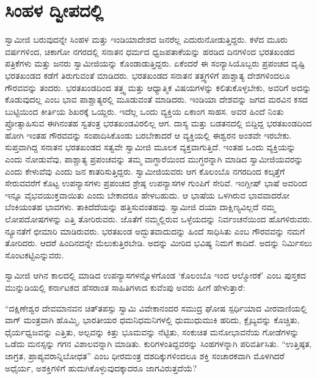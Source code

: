 
\chapter{ಸಿಂಹಳ ದ್ವೀಪದಲ್ಲಿ}

 ಸ್ವಾಮೀಜಿ ಬರುವುದನ್ನೇ ಸಿಂಹಳ ಮತ್ತು ಇಂಡಿಯಾದೇಶದ ಜನರೆಲ್ಲ ಎದುರು\break ನೋಡುತ್ತಿದ್ದರು. ಕಳೆದ ಮೂರು ವರ್ಷಗಳಿಂದ, ಚಿಕಾಗೋ ನಗರದಲ್ಲಿ ಸನಾತನ ಧರ್ಮದ ಧ್ವಜಪತಾಕೆಯನ್ನು ಹರಡಿದ ದಿನಗಳಿಂದ ಭರತಖಂಡದ ಪತ್ರಿಕೆಗಳು ಮತ್ತು ಜನರು ಸ್ವಾಮೀಜಿಯನ್ನು ಕೊಂಡಾಡುತ್ತಿದ್ದರು. ಏಕೆಂದರೆ ಈ ಸಂನ್ಯಾಸಿಯೊಬ್ಬರು ಪ್ರಪಂಚದ ದೃಷ್ಟಿ ಭರತಖಂಡದ ಕಡೆಗೆ ತಿರುಗುವಂತೆ ಮಾಡಿದರು. ಭರತಖಂಡದ ಸನಾತನ ತತ್ತ್ವಗಳಿಗೆ ಪಾಶ್ಚಾತ್ಯ ದೇಶಗಳಿಂದಲೂ ಗೌರವವನ್ನು ತಂದರು. ಭರತಖಂಡದಿಂದ ತತ್ತ್ವ ಮತ್ತು ಆಧ್ಯಾತ್ಮಿಕ ವಿಷಯಗಳನ್ನು ಕಲಿತುಕೊಳ್ಳಬೇಕು, ಅವರಿಗೆ ಅದನ್ನು ಕೊಡುವುದಲ್ಲ ಎಂಬ ಭಾವ ಪಾಶ್ಚಾತ್ಯರಲ್ಲಿ ಮೂಡುವಂತೆ ಮಾಡಿದರು. ಇಂಡಿಯಾ ದೇಶವನ್ನು ಜಗದ ಮರವಿನ ಕಸದ ಬುಟ್ಟಿಯಿಂದ ಕೀರ್ತಿಯ ಶಿಖರಕ್ಕೆ ಒಯ್ದರು. ಇದೆಲ್ಲ ಒಂದು ವ್ಯಕ್ತಿಯ ಏಕಾಂಗ ಸಾಹಸ. ಅವರ ಹಿಂದೆ ನಿಂತು ಪ್ರೋತ್ಸಾಹಿಸುವ ಈಗಿನಂತಹ ಸ್ವತಂತ್ರ ಭರತಖಂಡವಿರಲಿಲ್ಲ ಆಗ. ದಾಸ್ಯ ಮತ್ತು ಬಡತನದಲ್ಲಿ ಬಿದ್ದಿದ್ದ ಭರತಖಂಡದಿಂದ ಹೋಗಿ ಇಂತಹ ಗೌರವವನ್ನು ಸಂಪಾದಿಸಿಕೊಂಡು ಬರಬೇಕಾದರೆ ಆ ವ್ಯಕ್ತಿಯಲ್ಲಿ ಈಶ್ವರನ ಅಂಶವೇ ಇರಬೇಕು. ಸುಪ್ತವಾಗಿದ್ದ ಸನಾತನ ಭರತಖಂಡದ ಸತ್ವವೇ ಸ್ವಾಮೀಜಿ ಮೂಲಕ ವ್ಯಕ್ತವಾಗುತ್ತಿದೆ. ಇಂತಹ ಒಂದು ವ್ಯಕ್ತಿಯನ್ನು ಎಂದು ನೋಡುವೆವು, ಪಾಶ್ಚಾತ್ಯ ಪ್ರಪಂಚವನ್ನು ತಮ್ಮ ವಾಗ್ಧಾರೆಯಿಂದ ಮುಗ್ಧರನ್ನಾಗಿ ಮಾಡಿದ ಸ್ವಾಮೀಜಿಯವರನ್ನು ಎಂದು ಕೇಳುವೆವು ಎಂದು ಜನ ಕಾತರಿಸುತ್ತಿದ್ದರು. ಸ್ವಾಮೀಜಿಯವರು ಆಗ ಕೊಲಂಬೊ ನಗರದಿಂದ ಕಲ್ಕತ್ತೆಗೆ ಸೇರುವವರೆಗೆ ಕೊಟ್ಟ ಉಪನ್ಯಾಸಗಳು ಪ್ರಪಂಚದ ಶ್ರೇಷ್ಠ ಉಪನ್ಯಾಸಗಳ ಗುಂಪಿಗೆ ಸೇರಿವೆ. ಇಂಗ್ಲೀಷ್ ಭಾಷೆ ಅವರಿಂದ ಇನ್ನೂ ವೈಭವಯುಕ್ತವಾಯಿತು ಎಂದು ಬೇಕಾದರೂ ಹೇಳಬಹುದು. ಆ ಭಾಷೆಯ ಒಳಗಿರುವ ಭಾವವಾದರೋ‌ ಬೆಂಕಿಯಂತಹ ಭಾವಗಳು. ತಾಕಿದೆದೆಯನ್ನು ಹತ್ತಿಸುವಂತಹವು. ಸ್ವಾಮೀಜಿ ದಯಾ ದಾಕ್ಷಿಣ್ಯವಿಲ್ಲದೆ ನಮ್ಮ ಲೋಪದೋಷಗಳನ್ನು ಎತ್ತಿ ತೋರಿರುವರು. ಜೊತೆಗೆ ನಮ್ಮಲ್ಲಿರುವ ಒಳ್ಳೆಯದನ್ನು ನಿರ್ವಂಚನೆಯಿಂದ ಹೊಗಳಿರುವರು. ನ್ಯೂನತೆಗೆ ಛೀಮಾರಿ ಮಾಡಿರುವರು. ಭರತಖಂಡ ಅದ್ಭುತವಾದುದನ್ನು ಹಿಂದೆ ಸಾಧಿಸಿತು ಎಂಬ ಗೌರವವನ್ನು ನಮಗೆ ತೋರಿದರು. ಆದರೆ ಹಿಂದಿನದನ್ನೇ ಮೆಲುಕುತ್ತಿರಬೇಡಿ. ಅದನ್ನು ಮೀರಿದ ಭವಿಷ್ಯ ನಿಮಗೆ ಕಾದಿದೆ. ಅದನ್ನು ನಿರ್ಮಿಸಲು ಸೊಂಟಕಟ್ಟಿ\break ಎನ್ನುವರು. 

 ಸ್ವಾಮೀಜಿ ಆಗಿನ ಕಾಲದಲ್ಲಿ ಮಾಡಿದ ಉಪನ್ಯಾಸಗಳನ್ನೊಳಗೊಂಡ ‘ಕೊಲಂಬೊ ಇಂದ ಆಲ್ಮೋರಕೆ’ ಎಂಬ ಪುಸ್ತಕದ ಮುನ್ನುಡಿಯಲ್ಲಿ ಕರ್ನಾಟಕದ ಹೆಸರಾಂತ ಸಾಹಿತಿಗಳಾದ ಕುವೆಂಪು ಅವರು ಹೀಗೆ ಹೇಳುತ್ತಾರೆ: 

 “ದಕ್ಷಿಣೇಶ್ವರ ದೇವಮಾನವನ ಚಿತ್​ತಪಸ್ಸು ಸ್ವಾಮಿ ವಿವೇಕಾನಂದರ ಸಮುದ್ರ ಘೋಷ ಸ್ಪರ್ಧಿಯಾದ ವೀರವಾಣಿಯಲ್ಲಿ ವಾಗ್ ಮಂತ್ರವಾಗಿ ಹೊಮ್ಮಿ, ಭಾರತೀಯರ ಧಮನಿಧಮನಿಗಳಲ್ಲಿ ಧುಮುಧುಮುಕಿ ಹರಿದು, ಕ್ಲೈಬ್ಯವನ್ನು ಕೊಚ್ಚಿತು, ಧೈರ್ಯಧ್ವಜವನ್ನು ಎತ್ತಿತು, ಅಲ್ಪವನ್ನು ಕಿತ್ತು ಭೂಮವನ್ನು ನೆಟ್ಟಿತು, ಸಂಕುಚಿತ ಮನೋಭಾವನೆಯ ಗೋಡೆಗಳನ್ನು ಒಡೆದು ಮನಸ್ಸನ್ನು ಗಗನ ವಿಶಾಲವನ್ನಾಗಿ ಮಾಡಿತು. ಕುರಿಗಳಂತಿದ್ದವರನ್ನು ಸಿಂಹಗಳನ್ನಾಗಿ ಪರಿವರ್ತಿಸಿತು. “ಉತ್ತಿಷ್ಠತ, ಜಾಗ್ರತ, ಪ್ರಾಪ್ಯವರಾನ್ನಿಬೋಧತ” ಎಂಬ ಧೀರಮಂತ್ರ ದಶದಿಕ್ಕುಗಳಿಂದಲೂ ಶಕ್ತಿ ಸಂಚಾರಕವಾಗಿ ಮೊಳಗಿದರೆ ಅಧೈರ್ಯ, ಅಶಕ್ತಿಗಳಿಗೆ ಹುದುಗಿಕೊಳ್ಳುವುದಕ್ಕಾದರೂ ಜಾಗವಿರುತ್ತದೆಯೆ? 

